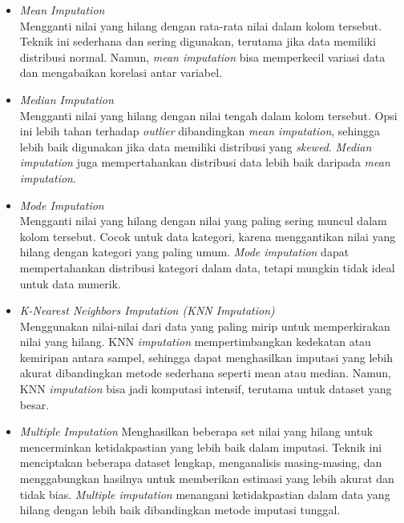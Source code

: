\documentclass[conference]{IEEEtran}
\begin{document}
\begin{itemize}
    \item \textit{Mean Imputation} \\
    Mengganti nilai yang hilang dengan rata-rata nilai dalam kolom tersebut. Teknik ini sederhana dan sering digunakan, terutama jika data 
    memiliki distribusi normal. Namun, \textit{mean imputation} bisa memperkecil variasi data dan mengabaikan korelasi antar variabel.
    \item \textit{Median Imputation} \\
    Mengganti nilai yang hilang dengan nilai tengah dalam kolom tersebut. Opsi ini lebih tahan terhadap \textit{outlier} dibandingkan \textit{mean imputation}, 
    sehingga lebih baik digunakan jika data memiliki distribusi yang \textit{skewed}. \textit{Median imputation} juga mempertahankan distribusi data lebih baik daripada \textit{mean imputation}.
    \item \textit{Mode Imputation} \\
    Mengganti nilai yang hilang dengan nilai yang paling sering muncul dalam kolom tersebut. Cocok untuk data kategori, karena menggantikan nilai yang hilang 
    dengan kategori yang paling umum. \textit{Mode imputation} dapat mempertahankan distribusi kategori dalam data, tetapi mungkin tidak ideal untuk data numerik.
    \item \textit{K-Nearest Neighbors Imputation (KNN Imputation)} \\
    Menggunakan nilai-nilai dari data yang paling mirip untuk memperkirakan nilai yang hilang. KNN \textit{imputation} mempertimbangkan kedekatan atau kemiripan antara sampel, 
    sehingga dapat menghasilkan imputasi yang lebih akurat dibandingkan metode sederhana seperti mean atau median. Namun, KNN \textit{imputation} bisa jadi komputasi intensif, terutama 
    untuk dataset yang besar.
    \item \textit{Multiple Imputation}
    Menghasilkan beberapa set nilai yang hilang untuk mencerminkan ketidakpastian yang lebih baik dalam imputasi. Teknik ini menciptakan beberapa dataset lengkap, menganalisis masing-masing, 
    dan menggabungkan hasilnya untuk memberikan estimasi yang lebih akurat dan tidak bias. \textit{Multiple imputation} menangani ketidakpastian dalam data yang hilang dengan lebih baik dibandingkan metode imputasi tunggal.

\end{itemize}
\end{document}

